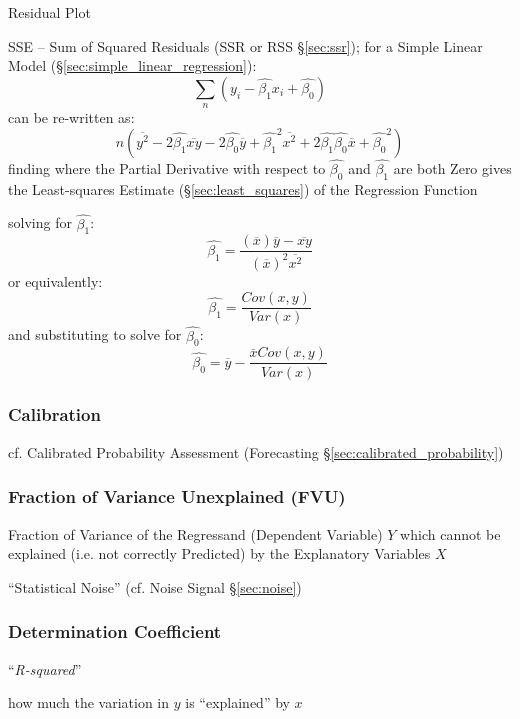 Residual Plot

SSE -- Sum of Squared Residuals (SSR or RSS \S\ref{sec:ssr}); for a Simple
Linear Model (\S\ref{sec:simple_linear_regression}):
\[
  \sum_n (y_i - \hat{\beta_1} x_i + \hat{\beta_0})
\]
can be re-written as:
\[
  n (\overline{y^2} - 2 \hat{\beta_1} \overline{x y}
    - 2 \hat{\beta_0} \overline{y} + \hat{\beta_1}^2 \overline{x^2}
    + 2 \hat{\beta_1} \hat{\beta_0} \overline{x} + \hat{\beta_0}^2)
\]
finding where the Partial Derivative with respect to $\hat{\beta_0}$ and
$\hat{\beta_1}$ are both Zero gives the Least-squares Estimate
(\S\ref{sec:least_squares}) of the Regression Function

solving for $\hat{\beta_1}$:
\[
  \hat{\beta_1} = \frac{
    (\overline{x})\overline{y} - \overline{xy}
  }{
    (\overline{x})^2 \overline{x^2}
  }
\]
or equivalently:
\[
  \hat{\beta_1} = \frac{
    Cov(x,y)
  }{
    Var(x)
  }
\]
and substituting to solve for $\hat{\beta_0}$:
\[
  \hat{\beta_0} = \overline{y} - \frac{
    \overline{x} Cov(x,y)
  }{
    Var(x)
  }
\]



\subsubsection{Calibration}\label{sec:calibration}

\fist cf. Calibrated Probability Assessment (Forecasting
\S\ref{sec:calibrated_probability})



\subsubsection{Fraction of Variance Unexplained (FVU)}\label{sec:fvu}

Fraction of Variance of the Regressand (Dependent Variable) $Y$ which cannot be
explained (i.e. not correctly Predicted) by the Explanatory Variables $X$

``Statistical Noise'' (cf. Noise Signal \S\ref{sec:noise})



\subsubsection{Determination Coefficient}\label{sec:determination_coefficient}

``\emph{R-squared}''

how much the variation in $y$ is ``explained'' by $x$


